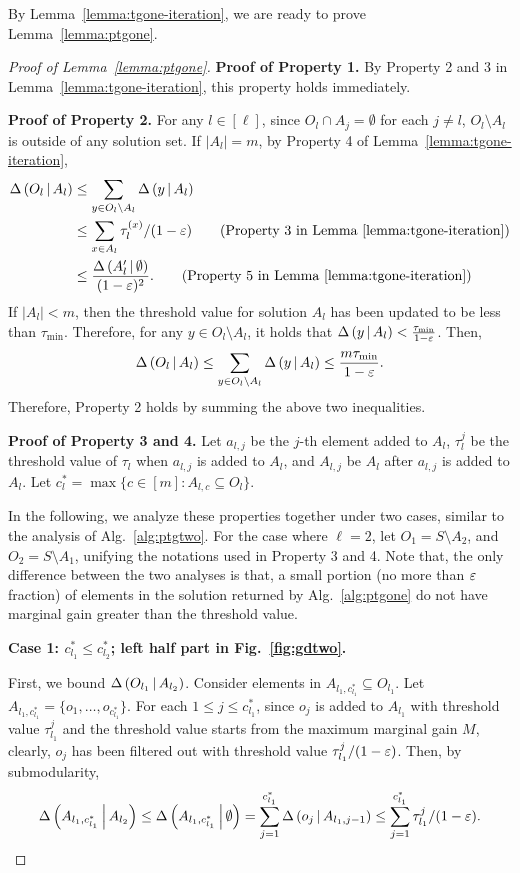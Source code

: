 By Lemma~\ref{lemma:tgone-iteration},
we are ready to prove Lemma~\ref{lemma:ptgone}.
\begin{proof}[Proof of Lemma~\ref{lemma:ptgone}]
\textbf{Proof of Property 1.}
By Property 2 and 3 in Lemma~\ref{lemma:tgone-iteration},
this property holds immediately.

\textbf{Proof of Property 2.}
For any $l\in [\ell]$,
since $O_l\cap A_j  = \emptyset$ for each $j\neq l$,
$O_l\setminus A_l$ is outside of any solution set.
If $|A_l| = m$, by Property 4 of Lemma~\ref{lemma:tgone-iteration},
\begin{align*}
\marge{O_l}{A_l} &\le \sum_{y \in O_l\setminus A_l}\marge{y}{A_l}\\
&\le \sum_{x \in A_l}\tau_l^{(x)}/(1-\epsi)\tag{Property 3 in Lemma~\ref{lemma:tgone-iteration}}\\
& \le \frac{\marge{A_l'}{\emptyset}}{(1-\epsi)^2}.\tag{Property 5 in Lemma~\ref{lemma:tgone-iteration}}
\end{align*}
If $|A_l| < m$, then the threshold value for solution $A_l$ has been updated to be less than $\tau_{\min}$.
Therefore, for any $y\in O_l\setminus A_l$,
it holds that $\Delta \left( y \, \middle| \, A_l \right) < \frac{\tau_{\min}}{1-\varepsilon}$.
Then,
\begin{align*}
\Delta \left( O_l \, \middle| \, A_l \right) \le \sum_{y \in O_l\setminus A_l}\Delta \left( y \, \middle| \, A_l \right)
\le \frac{m\tau_{\min}}{1-\varepsilon}.
\end{align*}
Therefore, Property 2 holds by summing the above two inequalities.

\textbf{Proof of Property 3 and 4.}
Let $a_{l, j}$ be the $j$-th element added to $A_l$,
$\tau_l^j$ be the threshold value of $\tau_l$ when $a_{l, j}$ is added to $A_l$,
and $A_{l, j}$ be $A_l$ after $a_{l, j}$ is added to $A_l$.
Let $c_l^* = \max\{c\in [m]:A_{l, c}\subseteq O_l\}$.

In the following, we analyze these properties together under two cases,
similar to the analysis of Alg.~\ref{alg:ptgtwo}.
For the case where $\ell = 2$, 
let $O_{1} = S\setminus A_2$, and $O_2 = S\setminus A_1$,
unifying the notations used in Property 3 and 4.
Note that, the only difference between the two analyses is that,
a small portion (no more than $\varepsilon$ fraction) of elements in the solution returned by Alg.~\ref{alg:ptgone}
do not have marginal gain greater than the threshold value.

\textbf{Case 1: $c_{l_1}^*\le c_{l_2}^*$; left half part in Fig.~\ref{fig:gdtwo}.}

First, we bound $\Delta \left( O_{l_1} \, \middle| \, A_{l_2} \right)$.
Consider elements in $A_{l_1, c_{l_1}^*} \subseteq O_{l_1}$.
Let $A_{l_1, c_{l_1}^*} = \{o_1, \ldots, o_{c_{l_1}^*}\}$.
For each $1\le j \le c_{l_1}^*$, 
since $o_j$ is added to $A_{l_1}$ with threshold value $\tau_{l_1}^{j}$
and the threshold value starts from the maximum marginal gain $M$,
clearly, $o_j$ has been filtered out with threshold value $\tau_{l_1}^{j}/(1-\varepsilon)$.
Then, by submodularity,
\begin{equation}\label{inq:ptgone-case1-1}
\Delta \left( A_{l_1, c_{l_1}^*}  \, \middle| \, A_{l_2} \right) \le \Delta \left( A_{l_1, c_{l_1}^*}  \, \middle| \, \emptyset \right)
 = \sum_{j=1}^{c_{l_1}^*}\Delta \left( o_j \, \middle| \, A_{l_1, j-1} \right)
 \le \sum_{j=1}^{c_{l_1}^*} \tau_{l_1}^{j}/(1-\varepsilon).
\end{equation}


\end{proof}

